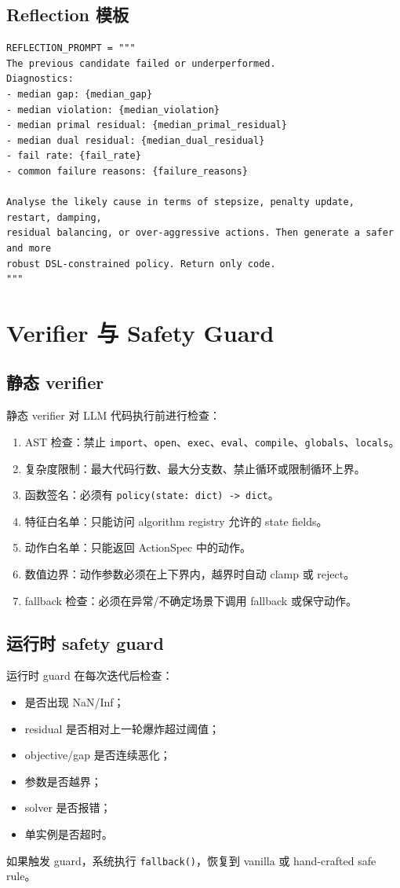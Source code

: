 \documentclass[12pt,a4paper]{ctexart}
\begin{document}
\subsection{Reflection 模板}

\begin{lstlisting}[style=pythonstyle]
REFLECTION_PROMPT = """
The previous candidate failed or underperformed.
Diagnostics:
- median gap: {median_gap}
- median violation: {median_violation}
- median primal residual: {median_primal_residual}
- median dual residual: {median_dual_residual}
- fail rate: {fail_rate}
- common failure reasons: {failure_reasons}

Analyse the likely cause in terms of stepsize, penalty update, restart, damping,
residual balancing, or over-aggressive actions. Then generate a safer and more
robust DSL-constrained policy. Return only code.
"""
\end{lstlisting}

\section{Verifier 与 Safety Guard}

\subsection{静态 verifier}
静态 verifier 对 LLM 代码执行前进行检查：
\begin{enumerate}
    \item AST 检查：禁止 \texttt{import}、\texttt{open}、\texttt{exec}、\texttt{eval}、\texttt{compile}、\texttt{globals}、\texttt{locals}。
    \item 复杂度限制：最大代码行数、最大分支数、禁止循环或限制循环上界。
    \item 函数签名：必须有 \texttt{policy(state: dict) -> dict}。
    \item 特征白名单：只能访问 algorithm registry 允许的 state fields。
    \item 动作白名单：只能返回 ActionSpec 中的动作。
    \item 数值边界：动作参数必须在上下界内，越界时自动 clamp 或 reject。
    \item fallback 检查：必须在异常/不确定场景下调用 fallback 或保守动作。
\end{enumerate}

\subsection{运行时 safety guard}
运行时 guard 在每次迭代后检查：
\begin{itemize}
    \item 是否出现 NaN/Inf；
    \item residual 是否相对上一轮爆炸超过阈值；
    \item objective/gap 是否连续恶化；
    \item 参数是否越界；
    \item solver 是否报错；
    \item 单实例是否超时。
\end{itemize}
如果触发 guard，系统执行 \texttt{fallback()}，恢复到 vanilla 或 hand-crafted safe rule。
\end{document}
